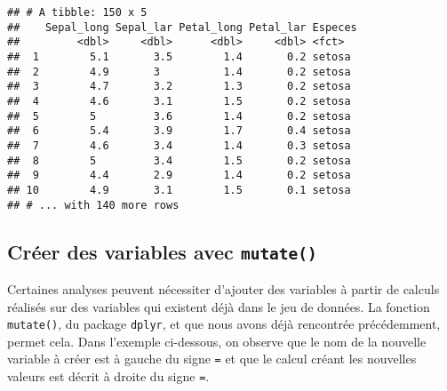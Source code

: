 \documentclass[
  french,
]{book}
\newenvironment{Shaded}{\begin{snugshade}}{\end{snugshade}}
\newcommand{\DataTypeTok}[1]{\textcolor[rgb]{0.13,0.29,0.53}{#1}}
\newcommand{\KeywordTok}[1]{\textcolor[rgb]{0.13,0.29,0.53}{\textbf{#1}}}
\newcommand{\NormalTok}[1]{#1}
\newcommand{\OperatorTok}[1]{\textcolor[rgb]{0.81,0.36,0.00}{\textbf{#1}}}
\newcommand{\StringTok}[1]{\textcolor[rgb]{0.31,0.60,0.02}{#1}}
\begin{document}
\begin{verbatim}
## # A tibble: 150 x 5
##    Sepal_long Sepal_lar Petal_long Petal_lar Especes
##         <dbl>     <dbl>      <dbl>     <dbl> <fct>  
##  1        5.1       3.5        1.4       0.2 setosa 
##  2        4.9       3          1.4       0.2 setosa 
##  3        4.7       3.2        1.3       0.2 setosa 
##  4        4.6       3.1        1.5       0.2 setosa 
##  5        5         3.6        1.4       0.2 setosa 
##  6        5.4       3.9        1.7       0.4 setosa 
##  7        4.6       3.4        1.4       0.3 setosa 
##  8        5         3.4        1.5       0.2 setosa 
##  9        4.4       2.9        1.4       0.2 setosa 
## 10        4.9       3.1        1.5       0.1 setosa 
## # ... with 140 more rows
\end{verbatim}

\hypertarget{cruxe9er-des-variables-avec-mutate}{%
\subsection{\texorpdfstring{Créer des variables avec \texttt{mutate()}}{Créer des variables avec mutate()}}\label{cruxe9er-des-variables-avec-mutate}}

Certaines analyses peuvent nécessiter d'ajouter des variables à partir de calculs réalisés sur des variables qui existent déjà dans le jeu de données. La fonction \texttt{mutate()}, du package \texttt{dplyr}, et que nous avons déjà rencontrée précédemment, permet cela. Dans l'exemple ci-dessous, on observe que le nom de la nouvelle variable à créer est à gauche du signe \texttt{=} et que le calcul créant les nouvelles valeurs est décrit à droite du signe \texttt{=}.

\begin{Shaded}
\end{Shaded}
\end{document}
